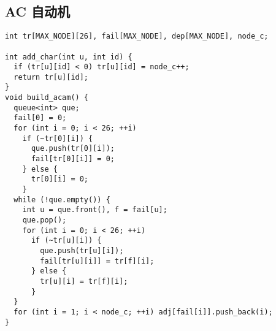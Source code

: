\subsection{AC 自动机}
\begin{lstlisting}
int tr[MAX_NODE][26], fail[MAX_NODE], dep[MAX_NODE], node_c;

int add_char(int u, int id) {
  if (tr[u][id] < 0) tr[u][id] = node_c++;
  return tr[u][id];
}
void build_acam() {
  queue<int> que;
  fail[0] = 0;
  for (int i = 0; i < 26; ++i)
    if (~tr[0][i]) {
      que.push(tr[0][i]);
      fail[tr[0][i]] = 0;
    } else {
      tr[0][i] = 0;
    }
  while (!que.empty()) {
    int u = que.front(), f = fail[u];
    que.pop();
    for (int i = 0; i < 26; ++i)
      if (~tr[u][i]) {
        que.push(tr[u][i]);
        fail[tr[u][i]] = tr[f][i];
      } else {
        tr[u][i] = tr[f][i];
      }
  }
  for (int i = 1; i < node_c; ++i) adj[fail[i]].push_back(i);
}
\end{lstlisting}
